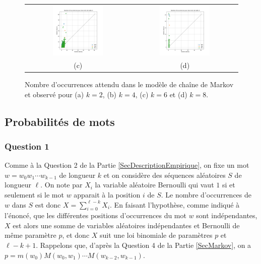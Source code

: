 \documentclass[a4paper,12pt]{article}
\begin{document}
\begin{figure}
\begin{tabular}{@{} c @{} c @{}}
\includegraphics[width=0.5\textwidth]{Figures/graphe_occurrences_Markov_6.png} & \includegraphics[width=0.5\textwidth]{Figures/graphe_occurrences_Markov_8.png} \tabularnewline
(c) & (d) \tabularnewline
\end{tabular}
\caption{Nombre d'occurrences attendu dans le modèle de chaîne de Markov et observé pour (a) $k = 2$, (b) $k = 4$, (c) $k = 6$ et (d) $k = 8$.}
\label{FigNbOccurrencesMarkov}
\end{figure}

\subsection{Probabilités de mots}

\subsubsection*{Question 1}

Comme à la Question 2 de la Partie \ref{SecDescriptionEmpirique}, on fixe un mot $w = w_0 w_1 \dotsm w_{k-1}$ de longueur $k$ et on considère des séquences aléatoires $S$ de longueur $\ell$. On note par $X_i$ la variable aléatoire Bernoulli qui vaut $1$ si et seulement si le mot $w$ apparait à la position $i$ de $S$. Le nombre d'occurrences de $w$ dans $S$ est donc $X = \sum_{i=0}^{\ell - k} X_i$. En faisant l'hypothèse, comme indiqué à l'énoncé, que les différentes positions d'occurrences du mot $w$ sont indépendantes, $X$ est alors une somme de variables aléatoires indépendantes et Bernoulli de même paramètre $p$, et donc $X$ suit une loi binomiale de paramètres $p$ et $\ell - k + 1$. Rappelons que, d'après la Question 4 de la Partie \ref{SecMarkov}, on a $p = m(w_0) M(w_0, w_1) \dotsm M(w_{k-2}, w_{k-1})$.
\end{document}
